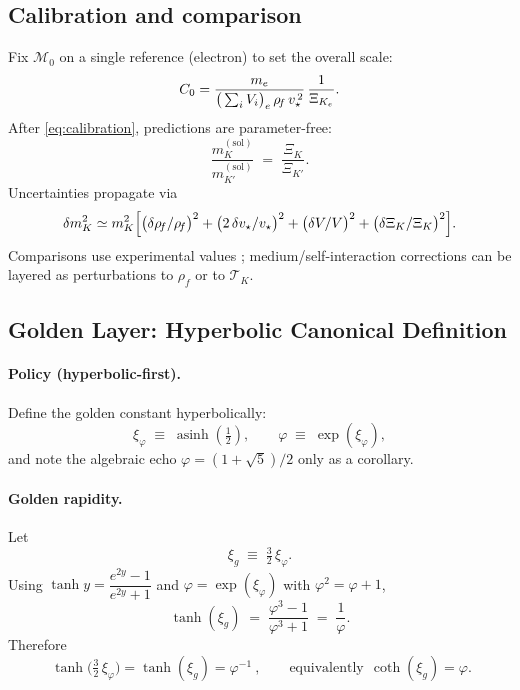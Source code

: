 \documentclass[11pt, preprint,titlepage]{revtex4-2}
\newcommand{\rhoF}{\rho_{\!f}}      %
\begin{document}
	\subsection{Calibration and comparison}

	Fix \(\mathcal{M}_0\) on a single reference (electron) to set the overall scale:
	\begin{equation}
		C_0
		= \frac{m_e}{\big(\sum_i V_i\big)_e \,\rhoF \,\vstar^{\,2}}\,
		\frac{1}{\Xi_{K_e}} .
		\label{eq:calibration}
	\end{equation}
	After \eqref{eq:calibration}, predictions are parameter-free:
	\[
		\frac{m_K^{(\mathrm{sol})}}{m_{K'}^{(\mathrm{sol})}}
		\;=\; \frac{\Xi_K}{\Xi_{K'}}.
	\]
	Uncertainties propagate via
	\begin{equation}
		\delta m_K^2 \simeq m_K^2\Big[
			\big(\delta\rhoF/\rhoF\big)^2
			+ \big(2\,\delta\vstar/\vstar\big)^2
			+ \big(\delta V/V\big)^2
			+ \big(\delta\Xi_K/\Xi_K\big)^2
			\Big].
	\end{equation}
	Comparisons use experimental values \cite{PDG2024}; medium/self-interaction corrections can be layered as perturbations to \(\rhoF\) or to \(\mathcal{T}_K\).

	\subsection{Golden Layer: Hyperbolic Canonical Definition}
	\label{sec:golden_layer}

	\paragraph*{Policy (hyperbolic-first).}
	Define the golden constant hyperbolically:
	\[
		\xi_\varphi \;\equiv\; \operatorname{asinh}\!\left(\tfrac{1}{2}\right),
		\qquad
		\varphi \;\equiv\; \exp(\xi_\varphi),
	\]
	and note the algebraic echo \(\varphi=(1+\sqrt5)/2\) only as a corollary.

	\paragraph*{Golden rapidity.}
	Let
	\[
		\xi_g \;\equiv\; \tfrac{3}{2}\,\xi_\varphi.
	\]
	Using \(\tanh y=\dfrac{e^{2y}-1}{e^{2y}+1}\) \cite{NISTDLMF} and \(\varphi=\exp(\xi_\varphi)\) with \(\varphi^2=\varphi+1\),
	\[
		\tanh(\xi_g) \;=\; \frac{\varphi^3-1}{\varphi^3+1}
		\;=\; \frac{1}{\varphi}.
	\]
	Therefore
	\[
		\boxed{\ \tanh\!\big(\tfrac{3}{2}\,\xi_\varphi\big)=\tanh(\xi_g)=\varphi^{-1}\ },
		\qquad\text{equivalently}\ \ \coth(\xi_g)=\varphi.
	\]
\end{document}
